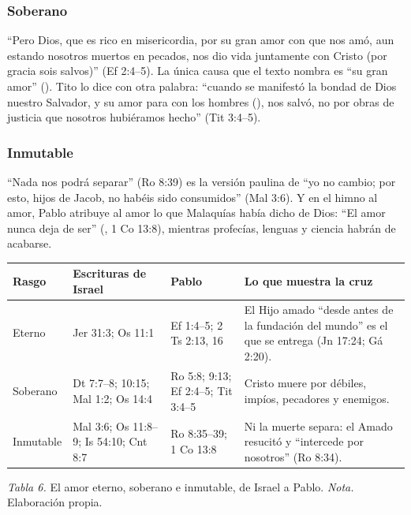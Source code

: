 \subsubsection*{Soberano}
``Pero Dios, que es rico en misericordia, por su gran amor con que nos amó, aun estando nosotros muertos en pecados, nos dio vida juntamente con Cristo (por gracia sois salvos)'' (Ef 2:4--5). La única causa que el texto nombra es ``su gran amor'' (). Tito lo dice con otra palabra: ``cuando se manifestó la bondad de Dios nuestro Salvador, y su amor para con los hombres (), nos salvó, no por obras de justicia que nosotros hubiéramos hecho'' (Tit 3:4--5).

\subsubsection*{Inmutable}
``Nada nos podrá separar'' (Ro 8:39) es la versión paulina de ``yo \SENOR{} no cambio; por esto, hijos de Jacob, no habéis sido consumidos'' (Mal 3:6). Y en el himno al amor, Pablo atribuye al amor lo que Malaquías había dicho de Dios: ``El amor nunca deja de ser'' (, 1 Co 13:8), mientras profecías, lenguas y ciencia habrán de acabarse.

\begin{center}\small\renewcommand{\arraystretch}{1.2}
\begin{tabular}{@{}L{2.2cm}L{4.2cm}L{4.2cm}L{4.2cm}@{}}
\toprule
\textbf{Rasgo} & \textbf{Escrituras de Israel} & \textbf{Pablo} & \textbf{Lo que muestra la cruz} \\ \midrule
Eterno & Jer 31:3; Os 11:1 & Ef 1:4--5; 2 Ts 2:13, 16 & El Hijo amado ``desde antes de la fundación del mundo'' es el que se entrega (Jn 17:24; Gá 2:20). \\
Soberano & Dt 7:7--8; 10:15; Mal 1:2; Os 14:4 & Ro 5:8; 9:13; Ef 2:4--5; Tit 3:4--5 & Cristo muere por débiles, impíos, pecadores y enemigos. \\
Inmutable & Mal 3:6; Os 11:8--9; Is 54:10; Cnt 8:7 & Ro 8:35--39; 1 Co 13:8 & Ni la muerte separa: el Amado resucitó y ``intercede por nosotros'' (Ro 8:34). \\
\bottomrule
\end{tabular}\par
{\footnotesize\color{gris}\textit{Tabla 6.} El amor eterno, soberano e inmutable, de Israel a Pablo. \textit{Nota.} Elaboración propia.}
\end{center}

